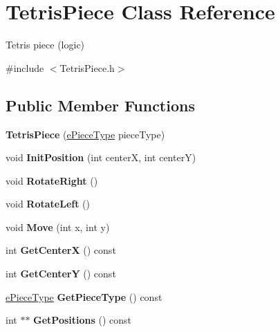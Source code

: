 \hypertarget{classTetrisPiece}{\section{Tetris\-Piece Class Reference}
\label{classTetrisPiece}
}


Tetris piece (logic)  




{\ttfamily \#include $<$Tetris\-Piece.\-h$>$}

\subsection*{Public Member Functions}
\begin{DoxyCompactItemize}
\item 
\hypertarget{classTetrisPiece_ae340fe95ba3c6c4384edc77627421589}{{\bfseries Tetris\-Piece} (\hyperlink{TetrisGfxBlock_8h_a2592cbf66d668df0e31fa8d0d8a174de}{e\-Piece\-Type} piece\-Type)}\label{classTetrisPiece_ae340fe95ba3c6c4384edc77627421589}

\item 
\hypertarget{classTetrisPiece_a9079416860e7ec68a7d6dbe1f14a6972}{void {\bfseries Init\-Position} (int center\-X, int center\-Y)}\label{classTetrisPiece_a9079416860e7ec68a7d6dbe1f14a6972}

\item 
\hypertarget{classTetrisPiece_ae7f7bbb647559a9a9d456705b2afec5d}{void {\bfseries Rotate\-Right} ()}\label{classTetrisPiece_ae7f7bbb647559a9a9d456705b2afec5d}

\item 
\hypertarget{classTetrisPiece_af5f68f58ee4295c9ebe8c11749d2ea15}{void {\bfseries Rotate\-Left} ()}\label{classTetrisPiece_af5f68f58ee4295c9ebe8c11749d2ea15}

\item 
\hypertarget{classTetrisPiece_a44933f5e7cd6c66ee24ad37c5de178b1}{void {\bfseries Move} (int x, int y)}\label{classTetrisPiece_a44933f5e7cd6c66ee24ad37c5de178b1}

\item 
\hypertarget{classTetrisPiece_aef41f6bfffa8e2d5f634b343b60a7788}{int {\bfseries Get\-Center\-X} () const }\label{classTetrisPiece_aef41f6bfffa8e2d5f634b343b60a7788}

\item 
\hypertarget{classTetrisPiece_abca21eaa135b96f75f7cac47eb662884}{int {\bfseries Get\-Center\-Y} () const }\label{classTetrisPiece_abca21eaa135b96f75f7cac47eb662884}

\item 
\hypertarget{classTetrisPiece_a43a36052c6a4cc20b968ea67cb4de579}{\hyperlink{TetrisGfxBlock_8h_a2592cbf66d668df0e31fa8d0d8a174de}{e\-Piece\-Type} {\bfseries Get\-Piece\-Type} () const }\label{classTetrisPiece_a43a36052c6a4cc20b968ea67cb4de579}

\item 
\hypertarget{classTetrisPiece_a9c6691566bac25ce9419a87713dd39e5}{int $\ast$$\ast$ {\bfseries Get\-Positions} () const }\label{classTetrisPiece_a9c6691566bac25ce9419a87713dd39e5}

\end{DoxyCompactItemize}
